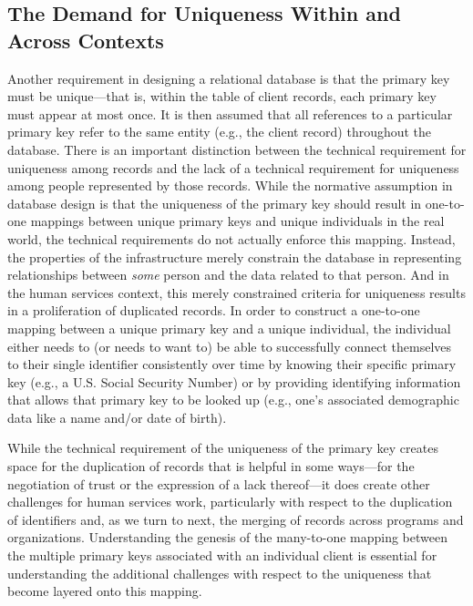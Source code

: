 \subsection{The Demand for Uniqueness Within and Across Contexts}
Another requirement in designing a relational database is that the primary key must be unique---that is, within the table of client records, each primary key must appear at most once. It is then assumed that all references to a particular primary key refer to the same entity (e.g., the client record) throughout the database. There is an important distinction between the technical requirement for uniqueness among records and the lack of a technical requirement for uniqueness among people represented by those records. While the normative assumption in database design is that the uniqueness of the primary key should result in one-to-one mappings between unique primary keys and unique individuals in the real world, the technical requirements do not actually enforce this mapping. Instead, the properties of the infrastructure merely constrain the database in representing relationships between \textit{some} person and the data related to that person. And in the human services context, this merely constrained criteria for uniqueness results in a proliferation of duplicated records. In order to construct a one-to-one mapping between a unique primary key and a unique individual, the individual either needs to (or needs to want to) be able to successfully connect themselves to their single identifier consistently over time by knowing their specific primary key (e.g., a U.S. Social Security Number) or by providing identifying information that allows that primary key to be looked up (e.g., one's associated demographic data like a name and/or date of birth). 

While the technical requirement of the uniqueness of the primary key creates space for the duplication of records that is helpful in some ways---for the negotiation of trust or the expression of a lack thereof---it does create other challenges for human services work, particularly with respect to the duplication of identifiers and, as we turn to next, the merging of records across programs and organizations. Understanding the genesis of the many-to-one mapping between the multiple primary keys associated with an individual client is essential for understanding the additional challenges with respect to the uniqueness that become layered onto this mapping.


